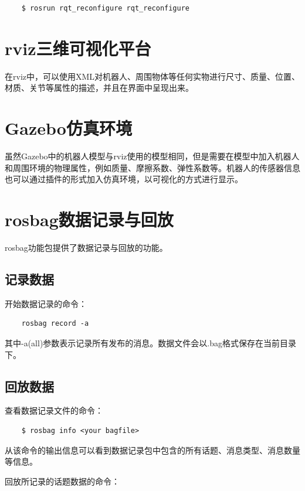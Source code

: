 \documentclass[10pt, oneside]{book}
\begin{document}
\begin{verbatim}
    $ rosrun rqt_reconfigure rqt_reconfigure
\end{verbatim}

\section{rviz三维可视化平台}

在rviz中，可以使用XML对机器人、周围物体等任何实物进行尺寸、质量、位置、材质、关节等属性的描述，并且在界面中呈现出来。

\section{Gazebo仿真环境}

虽然Gazebo中的机器人模型与rviz使用的模型相同，但是需要在模型中加入机器人和周围环境的物理属性，例如质量、摩擦系数、弹性系数等。机器人的传感器信息也可以通过插件的形式加入仿真环境，以可视化的方式进行显示。

\section{rosbag数据记录与回放}

rosbag功能包提供了数据记录与回放的功能。

\subsection{记录数据}

开始数据记录的命令：

\begin{verbatim}
    rosbag record -a
\end{verbatim}

其中-a(all)参数表示记录所有发布的消息。数据文件会以.bag格式保存在当前目录下。

\subsection{回放数据}

查看数据记录文件的命令：

\begin{verbatim}
    $ rosbag info <your bagfile>
\end{verbatim}

从该命令的输出信息可以看到数据记录包中包含的所有话题、消息类型、消息数量等信息。

回放所记录的话题数据的命令：
\end{document}
